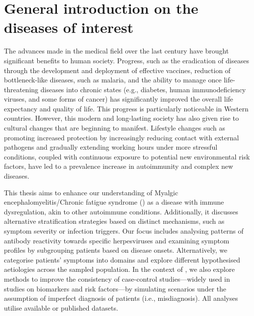 \chapter{General introduction on the diseases of interest}
\label{chapter:introduction}

The advances made in the medical field over the last century have brought significant benefits to human society. Progress, such as the eradication of diseases through the development and deployment of effective vaccines, reduction of bottleneck-like diseases, such as malaria, and the ability to manage once life-threatening diseases into chronic states (e.g., diabetes, human immunodeficiency viruses, and some forms of cancer) has significantly improved the overall life expectancy and quality of life. This progress is particularly noticeable in Western countries. However, this modern and long-lasting society has also given rise to cultural changes that are beginning to manifest. Lifestyle changes such as promoting increased protection by increasingly reducing contact with external pathogens and gradually extending working hours under more stressful conditions, coupled with continuous exposure to potential new environmental risk factors, have led to a prevalence increase in autoimmunity and complex new diseases.

This thesis aims to enhance our understanding of Myalgic encephalomyelitis/Chronic fatigue syndrome (\cfs) as a disease with immune dysregulation, akin to other autoimmune conditions. Additionally, it discusses alternative stratification strategies based on distinct mechanisms, such as symptom severity or infection triggers. Our focus includes analysing patterns of antibody reactivity towards specific herpesviruses and examining symptom profiles by subgrouping patients based on disease onsets. Alternatively, we categorise patients' symptoms into domains and explore different hypothesised aetiologies across the sampled population. In the context of \cfs, we also explore methods to improve the consistency of case-control studies---widely used in studies on biomarkers and risk factors---by simulating scenarios under the assumption of imperfect diagnosis of \cfs patients (i.e., misdiagnosis). All analyses utilise available or published datasets.

